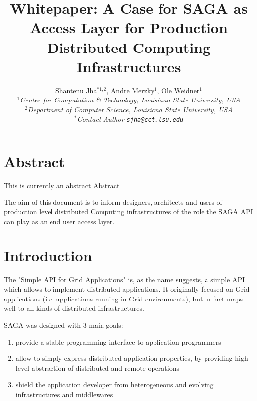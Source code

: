 \documentclass[12pt]{article}
\begin{document}
\title{Whitepaper: A Case for SAGA as Access Layer for Production
  Distributed Computing Infrastructures}

\author{Shantenu Jha$^{*1,2}$, Andre Merzky$^{1}$, Ole Weidner$^{1}$\\
  \small{\emph{$^{1}$Center for Computation \& Technology, Louisiana State University, USA}}\\
  \small{\emph{$^{2}$Department of Computer Science, Louisiana State University, USA}}\\
  \small{\emph{$^{*}$Contact Author \texttt{sjha@cct.lsu.edu}}}
  }


\maketitle

\section*{Abstract}

 This is currently an abstract Abstract

 The aim of this document is to inform designers, architects and users
 of production level distributed Computing infrastructures of the role
 the SAGA API can play as an end user access layer.

\section{Introduction}

 The "Simple API for Grid Applications"  is, as the name suggests, a
 simple API which allows to implement distributed applications.  It
 originally focused on Grid applications (i.e. applications running
 in Grid environments), but in fact maps well to all kinds of
 distributed infrastructures.

 SAGA was designed with 3 main goals:

 \begin{enumerate}

  \item provide a stable programming interface to application
  programmers
 
  \item allow to simply express distributed application properties,
  by providing high level abstraction of distributed and remote
  operations
  
  \item shield the application developer from heterogeneous and
  evolving infrastructures and middlewares

 \end{enumerate}
\end{document}
